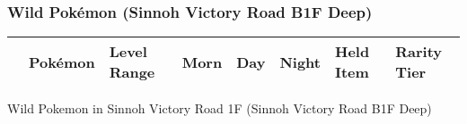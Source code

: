\subsubsection{Wild Pokémon (Sinnoh Victory Road B1F Deep)}%
\label{ssubsec:WildPokmon(SinnohVictoryRoadB1FDeep)}%
\begin{longtable}{||l l l l l l l l||}%
\hline%
\rowcolor{gray}%
&Pokémon&Level Range&Morn&Day&Night&Held Item&Rarity Tier\\%
\hline%
\endhead%
\hline%
\end{longtable}%
\caption{Wild Pokemon in Sinnoh Victory Road 1F (Sinnoh Victory Road B1F Deep)}